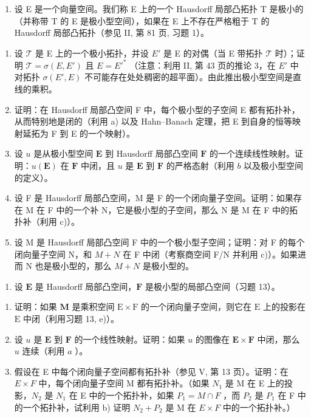 \begin{enumerate}
\def\labelenumi{\arabic{enumi})}
\setcounter{enumi}{12}
\tightlist
\item
  设 E 是一个向量空间。我们称 E 上的一个 Hausdorff 局部凸拓扑 T 是极小的（并称带 T 的 E 是极小型空间），如果在 E 上不存在严格粗于 T 的 Hausdorff 局部凸拓扑（参见 II, 第 81 页, 习题 1）。
\end{enumerate}

\begin{enumerate}
\def\labelenumi{\alph{enumi})}
\item
  设 \(\mathcal{T}\) 是 E 上的一个极小拓扑，并设 \(E'\) 是 E 的对偶（当 E 带拓扑 \(\mathcal{T}\) 时）；证明 \(\mathcal{T} = \sigma(E, E')\) 且 \(E = E'^*\) （注意：利用 II, 第 43 页的推论 3，在 \(E'\) 中对拓扑 \(\sigma(E', E)\) 不可能存在处处稠密的超平面）。由此推出极小型空间是直线的乘积。
\item
  证明：在 Hausdorff 局部凸空间 F 中，每个极小型的子空间 E 都有拓扑补，从而特别地是闭的（利用 a) 以及 Hahn--Banach 定理，把 E 到自身的恒等映射延拓为 F 到 E 的一个映射）。
\item
  设 \(u\) 是从极小型空间 \(\mathbf{E}\) 到 Hausdorff 局部凸空间 \(\mathbf{F}\) 的一个连续线性映射。证明：\(u(\mathbf{E})\) 在 \(\mathbf{F}\) 中闭，且 \(u\) 是 \(\mathbf{E}\) 到 \(\mathbf{F}\) 的严格态射（利用 \(b\) 以及极小型空间的定义）。
\item
  设 F 是 Hausdorff 局部凸空间，M 是 F 的一个闭向量子空间。证明：如果存在 M 在 F 中的一个补 N，它是极小型的子空间，那么 N 是 M 在 F 中的拓扑补（利用 c)）。
\item
  设 M 是 Hausdorff 局部凸空间 F 中的一个极小型子空间；证明：对 F 的每个闭向量子空间 N，和 \(M + N\) 在 F 中闭（考察商空间 F/N 并利用 c)）。如果进而 N 也是极小型的，那么 \(M + N\) 是极小型的。
\end{enumerate}

\begin{enumerate}
\def\labelenumi{\arabic{enumi})}
\setcounter{enumi}{13}
\tightlist
\item
  设 \(\mathbf{E}\) 是 Hausdorff 局部凸空间，\(\mathbf{F}\) 是极小型的局部凸空间（习题 13）。
\end{enumerate}

\begin{enumerate}
\def\labelenumi{\alph{enumi})}
\item
  证明：如果 \(\mathbf{M}\) 是乘积空间 \(\mathrm{E} \times \mathrm{F}\) 的一个闭向量子空间，则它在 \(\mathrm{E}\) 上的投影在 \(\mathrm{E}\) 中闭（利用习题 13, e)）。
\item
  设 \(u\) 是 \(\mathbf{E}\) 到 \(\mathbf{F}\) 的一个线性映射。证明：如果 \(u\) 的图像在 \(\mathbf{E} \times \mathbf{F}\) 中闭，那么 \(u\) 连续（利用 \(a\) ）。
\item
  假设在 E 中每个闭向量子空间都有拓扑补（参见 V, 第 13 页）。证明：在 \(E \times F\) 中，每个闭向量子空间 M 都有拓扑补。（如果 \(N_{1}\) 是 M 在 E 上的投影，\(N_{2}\) 是 \(N_{1}\) 在 E 中的一个拓扑补，如果 \(P_{1} = M \cap F\) ，而 \(P_{2}\) 是 \(P_{1}\) 在 F 中的一个拓扑补，试利用 b) 证明 \(N_{2} + P_{2}\) 是 M 在 \(E \times F\) 中的一个拓扑补。）
\end{enumerate}

